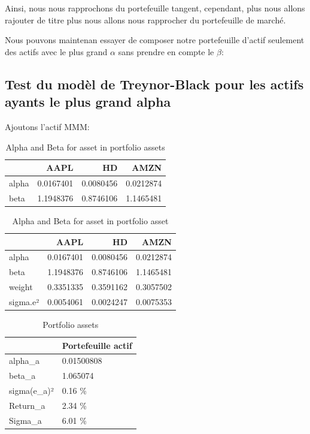 \documentclass[
]{article}
\begin{document}
Ainsi, nous nous rapprochons du portefeuille tangent, cependant, plus
nous allons rajouter de titre plus nous allons nous rapprocher du
portefeuille de marché.

Nous pouvons maintenan essayer de composer notre portefeuille d'actif
seulement des actifs avec le plus grand \(\alpha\) sans prendre en
compte le \(\beta\):

\hypertarget{test-du-moduxe8l-de-treynor-black-pour-les-actifs-ayants-le-plus-grand-alpha}{%
\subsection{Test du modèl de Treynor-Black pour les actifs ayants le
plus grand
alpha}\label{test-du-moduxe8l-de-treynor-black-pour-les-actifs-ayants-le-plus-grand-alpha}}

Ajoutons l'actif MMM:

\begin{table}[H]

\caption{\label{tab:unnamed-chunk-23}Alpha and Beta for asset in portfolio assets}
\centering
\begin{tabular}[t]{lrrr}
\toprule
  & AAPL & HD & AMZN\\
\midrule
alpha & 0.0167401 & 0.0080456 & 0.0212874\\
beta & 1.1948376 & 0.8746106 & 1.1465481\\
\bottomrule
\end{tabular}
\end{table}
\begin{table}[H]

\caption{\label{tab:unnamed-chunk-24}Alpha and Beta for asset in portfolio asset}
\centering
\begin{tabular}[t]{lrrr}
\toprule
  & AAPL & HD & AMZN\\
\midrule
alpha & 0.0167401 & 0.0080456 & 0.0212874\\
beta & 1.1948376 & 0.8746106 & 1.1465481\\
weight & 0.3351335 & 0.3591162 & 0.3057502\\
sigma.e² & 0.0054061 & 0.0024247 & 0.0075353\\
\bottomrule
\end{tabular}
\end{table}
\begin{table}[H]

\caption{\label{tab:unnamed-chunk-25}Portfolio assets}
\centering
\begin{tabular}[t]{ll}
\toprule
  & Portefeuille actif\\
\midrule
alpha\_a & 0.01500808\\
beta\_a & 1.065074\\
sigma(e\_a)² & 0.16 \%\\
Return\_a & 2.34 \%\\
Sigma\_a & 6.01 \%\\
\bottomrule
\end{tabular}
\end{table}
\end{document}
